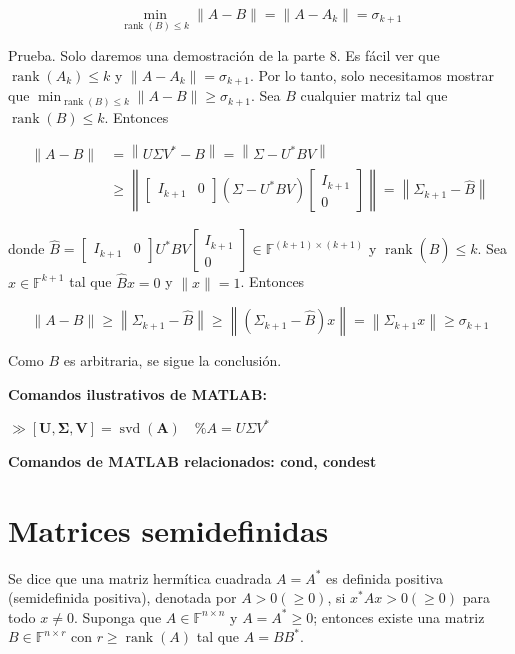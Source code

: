 $$
\min _{\operatorname{rank}(B) \leq k}\|A-B\|=\left\|A-A_{k}\right\|=\sigma_{k+1}
$$

Prueba. Solo daremos una demostración de la parte 8. Es fácil ver que $\operatorname{rank}\left(A_{k}\right) \leq k$ y $\left\|A-A_{k}\right\|=\sigma_{k+1}$. Por lo tanto, solo necesitamos mostrar que $\min _{\operatorname{rank}(B) \leq k}\|A-B\| \geq \sigma_{k+1}$. Sea $B$ cualquier matriz tal que $\operatorname{rank}(B) \leq k$. Entonces

$$
\begin{aligned}
\|A-B\| & =\left\|U \Sigma V^{*}-B\right\|=\left\|\Sigma-U^{*} B V\right\| \\
& \geq\left\|\left[\begin{array}{ll}
I_{k+1} & 0
\end{array}\right]\left(\Sigma-U^{*} B V\right)\left[\begin{array}{c}
I_{k+1} \\
0
\end{array}\right]\right\|=\left\|\Sigma_{k+1}-\hat{B}\right\|
\end{aligned}
$$

donde $\hat{B}=\left[\begin{array}{ll}I_{k+1} & 0\end{array}\right] U^{*} B V\left[\begin{array}{c}I_{k+1} \\ 0\end{array}\right] \in \mathbb{F}^{(k+1) \times(k+1)}$ y $\operatorname{rank}(\hat{B}) \leq k$. Sea $x \in \mathbb{F}^{k+1}$ tal que $\hat{B} x=0$ y $\|x\|=1$. Entonces

$$
\|A-B\| \geq\left\|\Sigma_{k+1}-\hat{B}\right\| \geq\left\|\left(\Sigma_{k+1}-\hat{B}\right) x\right\|=\left\|\Sigma_{k+1} x\right\| \geq \sigma_{k+1}
$$

Como $B$ es arbitraria, se sigue la conclusión.

\textbf{Comandos ilustrativos de MATLAB:}

$\gg[\mathbf{U}, \boldsymbol{\Sigma}, \mathbf{V}]=\operatorname{svd}(\mathbf{A}) \quad \% A=U \Sigma V^{*}$

\textbf{Comandos de MATLAB relacionados: cond, condest}

\section{Matrices semidefinidas}
Se dice que una matriz hermítica cuadrada $A=A^{*}$ es definida positiva (semidefinida positiva), denotada por $A>0(\geq 0)$, si $x^{*} A x>0(\geq 0)$ para todo $x \neq 0$. Suponga que $A \in \mathbb{F}^{n \times n}$ y $A=A^{*} \geq 0$; entonces existe una matriz $B \in \mathbb{F}^{n \times r}$ con $r \geq \operatorname{rank}(A)$ tal que $A=B B^{*}$.

